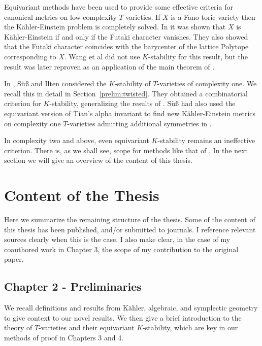 Equivariant methods have been used to provide some effective criteria for canonical metrics on low complexity \(T\)-varieties. If \(X\) is a Fano toric variety then the K\"ahler-Einstein problem is completely solved. In \cite{wang2004} it was shown that \(X\) is K\"ahler-Einstein if and only if the Futaki character vanishes. They also showed that the Futaki character coincides with the barycenter of the lattice Polytope corresponding to \(X\). Wang et al did not use \(K\)-stability for this result, but the result was later reproven as an application of the main theorem of \cite{datar2016kahler}.

In \cite{ilten2015}, S{\"u}{\ss} and Ilten considered the \(K\)-stability of \(T\)-varieties of complexity one. We recall this in detail in Section~\ref{prelim:twisted}. They obtained a combinatorial criterion for \(K\)-stability, generalizing the results of \cite{wang2004}. S{\"u}{\ss} had also used the equivariant version of Tian's alpha invariant to find new K\"ahler-Einstein metrics on complexity one \(T\)-varieties admitting additional symmetries in \cite{suss2013kahler}.

In complexity two and above, even equivariant \(K\)-stability remains an ineffective criterion. There is, as we shall see, scope for methods like that of \cite{suss2013kahler}. In the next section we will give an overview of the content of this thesis.

\section{Content of the Thesis} \label{content}
Here we summarize the remaining structure of the thesis. Some of the content of this thesis has been published, and/or submitted to journals. I reference relevant sources clearly when this is the case. I also make clear, in the case of my coauthored work in Chapter 3, the scope of my contribution to the original paper.
\subsection*{Chapter 2 - Preliminaries}
We recall definitions and results from K\"ahler, algebraic, and symplectic geometry to give context to our novel results. We then give a brief introduction to the theory of \(T\)-varieties and their equivariant \(K\)-stability, which are key in our methods of proof in Chapters 3 and 4.
